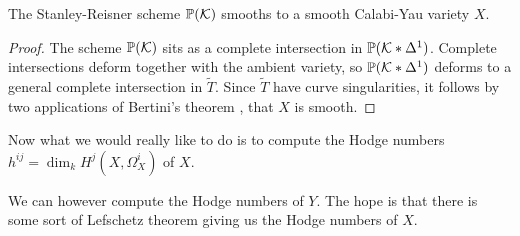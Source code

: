 \documentclass[11pt, english]{article}
\begin{document}
\begin{corr}
The Stanley-Reisner scheme $\mathbb{P}(\mathcal K)$ smooths to a smooth Calabi-Yau variety $X$.
\end{corr}
\begin{proof}
The scheme $\mathbb{P}(\mathcal K)$ sits as a complete intersection in $\mathbb{P}(\mathcal K \ast \Delta^1)$. Complete intersections deform together with the ambient variety, so $\mathbb{P}(\mathcal K \ast \Delta^1)$ deforms to a general complete intersection in $\widetilde T$. Since $\widetilde T$ have curve singularities, it follows by two applications of Bertini's theorem \cite[Theorem II.8.18]{hartshorne}, that $X$ is smooth.
\end{proof}

Now what we would really like to do is to compute the Hodge numbers $h^{ij}=\dim_k H^j(X,\Omega^i_X)$ of $X$. 

We can however compute the Hodge numbers of $Y$. The hope is that there is some sort of Lefschetz theorem giving us the Hodge numbers of $X$.
\end{document}
